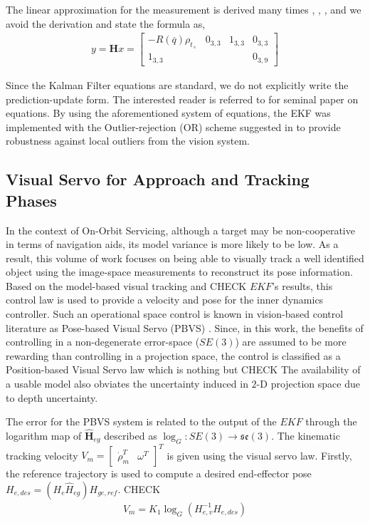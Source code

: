 The linear approximation for the measurement is derived many times \cite{Aghili07}, \cite{TweddlePhD}, \cite{Dubowsky}, and we avoid the derivation and state the formula as,
\begin{align}
y = \mathbf{H}x = \begin{bmatrix}
- R(\overline{q})\rho_{t_\times} & 0_{3,3} & 1_{3,3} & 0_{3,3}\\
 1_{3,3} &   & & 0_{3,9}
\end{bmatrix}
\end{align}

Since the Kalman Filter equations are standard, we do not explicitly write the prediction-update form. The interested reader is referred to \cite{Kalman} for seminal paper on equations. By using the aforementioned system of equations, the EKF was implemented with the Outlier-rejection (OR) scheme suggested in \cite{Selfpaper} to provide robustness against local outliers from the vision system.
%
\subsection{Visual Servo for Approach and Tracking Phases}
In the context of On-Orbit Servicing, although a target may be non-cooperative in terms of navigation aids, its model variance is more likely to be low. As a result, this volume of work focuses on being able to visually track a well identified object using the image-space measurements to reconstruct its pose information. Based on the model-based visual tracking and CHECK $EKF$'s results, this control law is used to provide a velocity and pose for the inner dynamics controller. Such an operational space control is known in vision-based control literature as Pose-based Visual Servo (PBVS) \cite{Chaumette}. Since, in this work, the benefits of controlling in a non-degenerate error-space ($SE(3)$) are assumed to be more rewarding than controlling in a projection space, the control is classified as a Position-based Visual Servo law which is nothing but CHECK The availability of a usable model also obviates the uncertainty induced in $2$-D projection space due to depth uncertainty. 

The error for the PBVS system is related to the output of the $EKF$ through the logarithm map of $\hat{\mathbf{H}}_{eg}$ described as $\log_G:SE(3)\rightarrow \mathfrak{se}(3)$. The kinematic tracking velocity $V_m =\begin{bmatrix}\dot{\rho}_m^T  &\omega^T\end{bmatrix}^T$ is given using the visual servo law. Firstly, the reference trajectory is used to compute a desired end-effector pose $H_{e,des} = (H_e\hat{H}_{eg}) H_{ge,ref}.$ CHECK
\begin{align}
 V_m = K_1 \log_G(H_{e,v}^{-1}H_{e,des})
\end{align}


